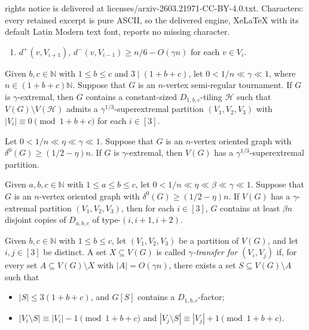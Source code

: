 \documentclass[10pt,a4paper]{amsart}
\begin{document}
rights notice is delivered at licenses/arxiv-2603.21971-CC-BY-4.0.txt. Characters: every retained excerpt is pure ASCII, so the delivered engine, XeLaTeX with its default Latin Modern text font, reports no missing character.
\begin{enumerate}[label=\upshape \textbf{(EP\arabic{enumi})},ref=\upshape (EP\arabic{enumi}),resume=mylist]
    \setlength{\itemindent}{1.5em}
    \item $d^+(v,V_{i+1}),\,d^-(v,V_{i-1})\geqslant n/6-O(\gamma n)$ for each $v\in V_i$.\label{EP2}
\end{enumerate}

\begin{lemma}\label{LEM:1bcbalance}
Given $b,c\in \mathbb{N}$ with  $1\leqslant b\leqslant c$ and $3\mid(1+b+c)$, let
$0<1/n\ll \gamma\ll 1$, where $n\in(1+b+c)\mathbb{N}$.
Suppose that $G$ is an $n$-vertex semi-regular tournament.
If $G$ is $\gamma$-extremal, then $G$ contains a constant-sized $D_{1,b,c}$-tiling $\mathcal{H}$ such that
$V(G)\setminus V(\mathcal{H})$ admits a $\gamma^{1/3}$-superextremal partition $(V_1,V_2,V_3)$ with
$|V_i|\equiv 0\pmod{1+b+c}$ for each $i\in[3]$.
\end{lemma}

\begin{lemma}\label{LEM:fexbad}
    Let $0<1/n\ll \eta \ll\gamma \ll 1$. Suppose that $G$ is an $n$-vertex oriented graph with $\delta^0(G)\geqslant(1/2-\eta)n$. If $G$ is $\gamma$-extremal, then $V(G)$ has a $\gamma^{1/3}$-superextremal partition. 
\end{lemma} 

\begin{lemma}\label{LEM:greedily Dabc}
    Given $a,b,c\in\mathbb{N}$ with $1\leqslant a\leqslant b\leqslant c$, let $0<1/n \ll \eta \ll \beta \ll \gamma \ll 1$. Suppose that $G$ is an $n$-vertex oriented graph with $\delta^0(G)\geqslant(1/2-\eta)n$. If $V(G)$ has a $\gamma$-extremal partition $(V_1,V_2,V_3)$, then for each $i\in[3]$, $G$ contains at least $\beta n$ disjoint copies of $D_{a,b,c}$ of type-$(i,i+1,i+2)$.
\end{lemma}

\begin{definition}\label{DEF:robust}
Given $b,c\in\mathbb{N}$ with $1\leqslant b\leqslant c$, let $(V_1,V_2,V_3)$ be a partition of $V(G)$, and let $i,j\in[3]$ be distinct. 
A set $X\subseteq V(G)$ is called  \emph{$\gamma$-transfer for $(V_i,V_j)$} if, for every set $A\subseteq V(G)\setminus X$ with $|A|=O( \gamma n)$, there exists a set $S\subseteq V(G)\setminus A$ such that
\begin{itemize}
\item $|S|\leqslant 3(1+b+c)$, and $G[S]$ contains a $D_{1,b,c}$-factor;
\item $|V_i\setminus S| \equiv |V_i|-1 \pmod{1+b+c}$ and $|V_j\setminus S| \equiv |V_j|+1 \pmod{1+b+c}$.
\end{itemize}
\end{definition}
\end{document}
